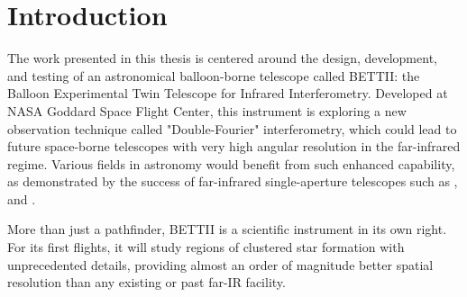 \chapter*{Introduction}
\label{chap:introduction}

The work presented in this thesis is centered around the design, development, and testing of an astronomical balloon-borne telescope called BETTII: the Balloon Experimental Twin Telescope for Infrared Interferometry. Developed at NASA Goddard Space Flight Center, this instrument is exploring a new observation technique called "Double-Fourier" interferometry, which could lead to future space-borne telescopes with very high angular resolution in the far-infrared regime. Various fields in astronomy would benefit from such enhanced capability, as demonstrated by the success of far-infrared single-aperture telescopes such as \WISE, \Spitzer and \Herschel. 

More than just a pathfinder, BETTII is a scientific instrument in its own right. For its first flights, it will study regions of clustered star formation with unprecedented details, providing almost an order of magnitude better spatial resolution than any existing or past far-IR facility.

